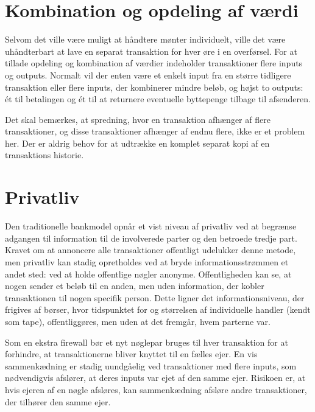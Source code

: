 \documentclass{article}
\begin{document}
\section{Kombination og opdeling af værdi}\label{sec:combining-and-splitting-value}
Selvom det ville være muligt at håndtere mønter individuelt, ville det være uhåndterbart at lave en separat transaktion for hver øre i en overførsel. For at tillade opdeling og
kombination af værdier indeholder transaktioner flere inputs og outputs. Normalt vil der enten være et enkelt input fra en større tidligere transaktion eller flere inputs, der
kombinerer mindre beløb, og højst to outputs: \'et til betalingen og \'et til at returnere eventuelle byttepenge tilbage til afsenderen.\\

\vspace{1em}

\vspace{1em}

Det skal bemærkes, at spredning, hvor en transaktion afhænger af flere transaktioner, og disse transaktioner afhænger af endnu flere, ikke er et problem her. Der er aldrig behov
for at udtrække en komplet separat kopi af en transaktions historie.

\section{Privatliv}\label{sec:privacy} Den traditionelle bankmodel opnår et vist niveau af privatliv ved at begrænse adgangen til information til de involverede parter og den
betroede tredje part. Kravet om at annoncere alle transaktioner offentligt udelukker denne metode, men privatliv kan stadig opretholdes ved at bryde informationsstrømmen et
andet sted: ved at holde offentlige nøgler anonyme. Offentligheden kan se, at nogen sender et beløb til en anden, men uden information, der kobler transaktionen til nogen
specifik person. Dette ligner det informationsniveau, der frigives af børser, hvor tidspunktet for og størrelsen af individuelle handler (kendt som \textquotedbl tape\textquotedbl),
offentliggøres, men uden at det fremgår, hvem parterne var.\\

\vspace{1em}

\vspace{1em}

Som en ekstra firewall bør et nyt nøglepar bruges til hver transaktion for at forhindre, at transaktionerne bliver knyttet til en fælles ejer. En vis sammenkædning er stadig
uundgåelig ved transaktioner med flere inputs, som nødvendigvis afslører, at deres inputs var ejet af den samme ejer. Risikoen er, at hvis ejeren af en nøgle afsløres, kan
sammenkædning afsløre andre transaktioner, der tilhører den samme ejer.
\end{document}
